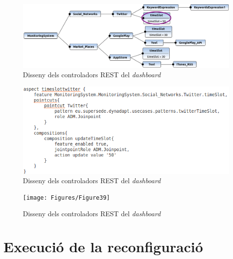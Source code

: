 \begin{figure}
\centering
\includegraphics[width=14cm]{Figures/Figure37}
\decoRule
\caption{Disseny dels controladors REST del \textit{dashboard}}
\label{fig:Figura37}
\end{figure} 

\begin{figure}
\centering
\includegraphics[width=14cm]{Figures/Figure38}
\decoRule
\caption{Disseny dels controladors REST del \textit{dashboard}}
\label{fig:Figura38}
\end{figure} 

\begin{figure}
\centering
\texttt{[image: Figures/Figure39]}
\decoRule
\caption{Disseny dels controladors REST del \textit{dashboard}}
\label{fig:Figura39}
\end{figure} 

\section{Execució de la reconfiguració}
